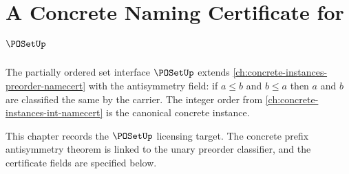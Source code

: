 \chapter{A Concrete Naming Certificate for $\POSetUp$}
\label{ch:concrete-instances-poset-namecert}

The partially ordered set interface $\POSetUp$ extends \autoref{ch:concrete-instances-preorder-namecert} with the antisymmetry field: if $a \le b$ and $b \le a$ then $a$ and $b$ are classified the same by the carrier. The integer order from \autoref{ch:concrete-instances-int-namecert} is the canonical concrete instance.

\begin{remark}
\label{rem:concrete-instances-poset-namecert-scope}
This chapter records the $\POSetUp$ licensing target. The concrete prefix
antisymmetry theorem is linked to the unary preorder classifier, and the
certificate fields are specified below.
\end{remark}
